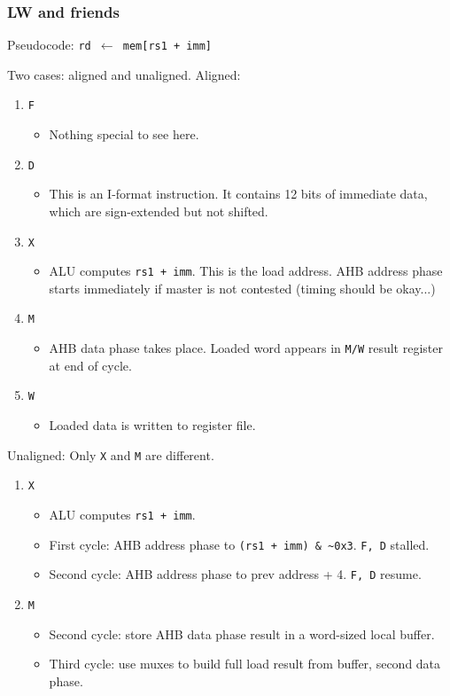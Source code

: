 \documentclass{article}
\begin{document}
\subsubsection{LW and friends}

Pseudocode: \texttt{rd $\leftarrow$ mem[rs1 + imm]}

Two cases: aligned and unaligned. Aligned:


\begin{enumerate}
	\item \texttt{F}
	\begin{itemize}
		\item Nothing special to see here.
	\end{itemize}
	\item \texttt{D}
	\begin{itemize}
		\item This is an I-format instruction. It contains 12 bits of immediate data, which are sign-extended but not shifted.
	\end{itemize}
	\item \texttt{X}
	\begin{itemize}
		\item ALU computes \texttt{rs1 + imm}. This is the load address. AHB address phase starts immediately if master is not contested (timing should be okay...)
	\end{itemize}
	\item \texttt{M}
	\begin{itemize}
		\item AHB data phase takes place. Loaded word appears in \texttt{M/W} result register at end of cycle.
	\end{itemize}
	\item \texttt{W}
	\begin{itemize}
		\item Loaded data is written to register file.
	\end{itemize}
\end{enumerate}

Unaligned: Only \texttt{X} and \texttt{M} are different.

\begin{enumerate}
	\item \texttt{X}
	\begin{itemize}
		\item ALU computes \texttt{rs1 + imm}.
		\item First cycle: AHB address phase to \texttt{(rs1 + imm) \& \textasciitilde 0x3}. \texttt{F, D} stalled.
		\item Second cycle: AHB address phase to prev address + 4. \texttt{F, D} resume.
	\end{itemize}
	\item \texttt{M}
	\begin{itemize}
		\item Second cycle: store AHB data phase result in a word-sized local buffer.
		\item Third cycle: use muxes to build full load result from buffer, second data phase.
	\end{itemize}
\end{enumerate}
\end{document}
